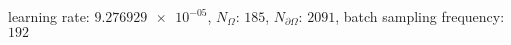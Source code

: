 learning rate: $\num[scientific-notation=true]{9.276929e-05}$, $N_{\Omega}$: $\num[scientific-notation=false]{185}$, $N_{\partial\Omega}$: $\num[scientific-notation=false]{2091}$, batch sampling frequency: $\num[scientific-notation=false]{192}$